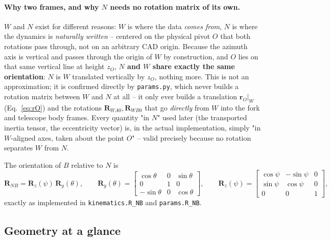 \documentclass[11pt,a4paper]{article}
\numberwithin{equation}{section}
\newcommand{\bs}[1]{\boldsymbol{#1}}
\begin{document}
\paragraph{Why two frames, and why $N$ needs no rotation matrix of its own.}
$W$ and $N$ exist for different reasons: $W$ is where the data \emph{comes from}, $N$ is where the dynamics is \emph{naturally written} -- centered on the physical pivot $O$ that both rotations pass through, not on an arbitrary CAD origin. Because the azimuth axis is vertical and passes through the origin of $W$ by construction, and $O$ lies on that same vertical line at height $z_O$, \textbf{$N$ and $W$ share exactly the same orientation}: $N$ is $W$ translated vertically by $z_O$, nothing more. This is not an approximation; it is confirmed directly by \texttt{params.py}, which never builds a rotation matrix between $W$ and $N$ at all -- it only ever builds a translation $\bs r_O|_W$ (Eq.~\eqref{eq:rO}) and the rotations $\bs R_{WA0}, \bs R_{WB0}$ that go \emph{directly} from $W$ into the fork and telescope body frames. Every quantity "in $N$" used later (the transported inertia tensor, the eccentricity vector) is, in the actual implementation, simply "in $W$-aligned axes, taken about the point $O$" -- valid precisely because no rotation separates $W$ from $N$.

The orientation of $B$ relative to $N$ is
\begin{equation}
\bs R_{NB} = \bs R_z(\psi)\,\bs R_y(\theta),
\qquad
\bs R_y(\theta) = \begin{bmatrix}\cos\theta & 0 & \sin\theta\\ 0&1&0\\ -\sin\theta & 0 & \cos\theta\end{bmatrix},
\qquad
\bs R_z(\psi) = \begin{bmatrix}\cos\psi & -\sin\psi & 0\\ \sin\psi&\cos\psi&0\\ 0&0&1\end{bmatrix},
\label{eq:RNB}
\end{equation}
exactly as implemented in \texttt{kinematics.R\_NB} and \texttt{params.R\_NB}.

\subsection{Geometry at a glance}
\label{subsec:diagram}
\end{document}
